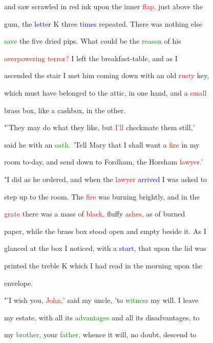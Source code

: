  and saw scrawled in red ink upon the inner \textcolor{red}{flap,} just above the

 gum, the \textcolor{blue}{letter} K three \textcolor{blue}{times} repeated. There was nothing else

 \textcolor{green}{save} the five dried pips. What could be the \textcolor{green}{reason} of his

 \textcolor{red}{overpowering} \textcolor{red}{terror?} I left the breakfast-table, and as I

 ascended the stair I met him coming down with an old \textcolor{red}{rusty} key,

 which must have belonged to the attic, in one hand, and a \textcolor{red}{small}

 brass box, like a cashbox, in the other.



 "'They may do what they like, but \textcolor{red}{I'll} checkmate them still,'

 said he with an \textcolor{green}{oath.} 'Tell Mary that I shall want a \textcolor{red}{fire} in my

 room to-day, and send down to Fordham, the Horsham \textcolor{red}{lawyer.'}



 "I did as he ordered, and when the \textcolor{red}{lawyer} \textcolor{blue}{arrived} I was asked to

 step up to the room. The \textcolor{red}{fire} was burning brightly, and in the

 \textcolor{red}{grate} there was a mass of \textcolor{red}{black,} fluffy \textcolor{red}{ashes,} as of burned

 paper, while the brass box stood open and empty beside it. As I

 glanced at the box I noticed, with a \textcolor{blue}{start,} that upon the lid was

 printed the treble K which I had read in the morning upon the

 envelope.



 "'I wish you, \textcolor{red}{John,'} said my uncle, 'to \textcolor{green}{witness} my will. I \textcolor{BurntOrange}{leave}

 my estate, with all its \textcolor{green}{advantages} and all its disadvantages, to

 my \textcolor{green}{brother,} your \textcolor{green}{father,} whence it will, no \textcolor{BurntOrange}{doubt,} descend to


